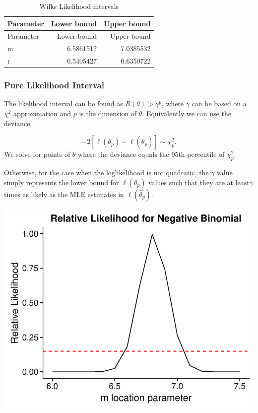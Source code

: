 \documentclass[11pt,preprint, authoryear]{elsarticle}
\numberwithin{equation}{section}
\numberwithin{figure}{section}
\numberwithin{table}{section}
\begin{document}
\begin{longtable}[]{@{}lrr@{}}
\caption{Wilks Likelihood intervals}\tabularnewline
\toprule
Parameter & Lower bound & Upper bound\tabularnewline
\midrule
\endfirsthead
\toprule
Parameter & Lower bound & Upper bound\tabularnewline
\midrule
\endhead
m & 6.5861512 & 7.0385532\tabularnewline
r & 0.5405427 & 0.6350722\tabularnewline
\bottomrule
\end{longtable}

\subsubsection{Pure Likelihood Interval}\label{pure-likelihood-interval}

The likelihood interval can be found as \(R(\theta) > \gamma^p\), where
\(\gamma\) can be based on a \(\chi^2\) approximation and \(p\) is the
dimension of \(\theta\). Equivalently we can use the deviance:

\[ -2[\ell(\theta_p) - \ell(\hat{\theta_p})] \sim \chi^2_p. \] We solve
for points of \(\theta\) where the deviance equals the 95th percentile
of \(\chi^2_p\).

Otherwise, for the case when the loglikelihood is not quadratic, the
\(\gamma\) value simply represents the lower bound for
\(\ell{(\theta_p)}\) values such that they are at least\(\gamma\) times
as likely as the MLE estimates in \(\ell{(\hat{\theta_p})}\).

\includegraphics{likelihood_files/figure-latex/unnamed-chunk-7-1.pdf}
\end{document}
